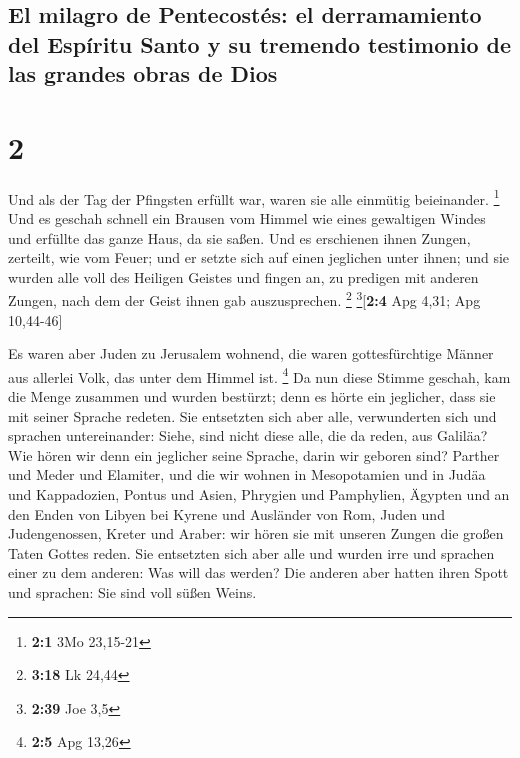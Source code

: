 \hypertarget{el-milagro-de-pentecostuxe9s-el-derramamiento-del-espuxedritu-santo-y-su-tremendo-testimonio-de-las-grandes-obras-de-dios}{%
\subsection{El milagro de Pentecostés: el derramamiento del Espíritu
Santo y su tremendo testimonio de las grandes obras de
Dios}\label{el-milagro-de-pentecostuxe9s-el-derramamiento-del-espuxedritu-santo-y-su-tremendo-testimonio-de-las-grandes-obras-de-dios}}

\hypertarget{section-1}{%
\section{2}\label{section-1}}

 Und als der Tag der Pfingsten erfüllt war, waren sie alle
einmütig beieinander. \footnote{\textbf{2:1} 3Mo 23,15-21}
 Und es geschah schnell ein Brausen vom Himmel wie eines
gewaltigen Windes und erfüllte das ganze Haus, da sie saßen.
 Und es erschienen ihnen Zungen, zerteilt, wie vom Feuer;
und er setzte sich auf einen jeglichen unter ihnen;  und
sie wurden alle voll des Heiligen Geistes und fingen an, zu predigen mit
anderen Zungen, nach dem der Geist ihnen gab auszusprechen. \footnote{\textbf{3:18}
  Lk 24,44} \footnote{\textbf{2:39} Joe 3,5}{[}\textbf{2:4} Apg 4,31;
Apg 10,44-46{]}

 Es waren aber Juden zu Jerusalem wohnend, die waren
gottesfürchtige Männer aus allerlei Volk, das unter dem Himmel ist.
\footnote{\textbf{2:5} Apg 13,26}  Da nun diese Stimme
geschah, kam die Menge zusammen und wurden bestürzt; denn es hörte ein
jeglicher, dass sie mit seiner Sprache redeten.  Sie
entsetzten sich aber alle, verwunderten sich und sprachen untereinander:
Siehe, sind nicht diese alle, die da reden, aus Galiläa? 
Wie hören wir denn ein jeglicher seine Sprache, darin wir geboren sind?
 Parther und Meder und Elamiter, und die wir wohnen in
Mesopotamien und in Judäa und Kappadozien, Pontus und Asien,
 Phrygien und Pamphylien, Ägypten und an den Enden von
Libyen bei Kyrene und Ausländer von Rom,  Juden und
Judengenossen, Kreter und Araber: wir hören sie mit unseren Zungen die
großen Taten Gottes reden.  Sie entsetzten sich aber alle
und wurden irre und sprachen einer zu dem anderen: Was will das werden?
 Die anderen aber hatten ihren Spott und sprachen: Sie
sind voll süßen Weins.

